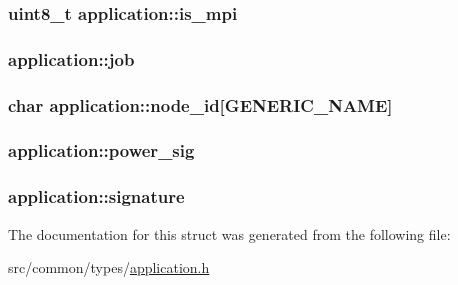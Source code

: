 \subsubsection[{\texorpdfstring{is\+\_\+mpi}{is_mpi}}]{\setlength{\rightskip}{0pt plus 5cm}uint8\+\_\+t application\+::is\+\_\+mpi}\hypertarget{structapplication_a4501cc16e6157433ae7362d924562ec8}{}\label{structapplication_a4501cc16e6157433ae7362d924562ec8}
\subsubsection[{\texorpdfstring{job}{job}}]{ application\+::job}\hypertarget{structapplication_a6d563fcc9d9458ed7cf89f84c8251fc1}{}\label{structapplication_a6d563fcc9d9458ed7cf89f84c8251fc1}
\subsubsection[{\texorpdfstring{node\+\_\+id}{node_id}}]{\setlength{\rightskip}{0pt plus 5cm}char application\+::node\+\_\+id\mbox{[}{\bf G\+E\+N\+E\+R\+I\+C\+\_\+\+N\+A\+ME}\mbox{]}}\hypertarget{structapplication_ace5ff39d996de45eaae623d1b9b5d018}{}\label{structapplication_ace5ff39d996de45eaae623d1b9b5d018}
\subsubsection[{\texorpdfstring{power\+\_\+sig}{power_sig}}]{ application\+::power\+\_\+sig}\hypertarget{structapplication_a0f37d24761a458af718e3e4c7d19be46}{}\label{structapplication_a0f37d24761a458af718e3e4c7d19be46}
\subsubsection[{\texorpdfstring{signature}{signature}}]{ application\+::signature}\hypertarget{structapplication_a88f30e4f12137cd152c91a9d494a763d}{}\label{structapplication_a88f30e4f12137cd152c91a9d494a763d}


The documentation for this struct was generated from the following file\+:\begin{DoxyCompactItemize}
\item 
src/common/types/\hyperlink{application_8h}{application.\+h}\end{DoxyCompactItemize}
